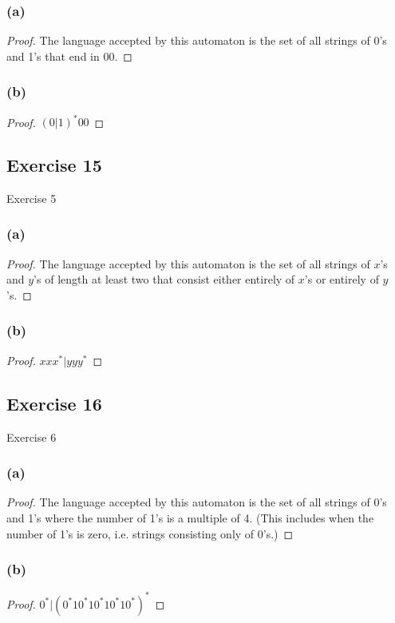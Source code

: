 \documentclass[14pt]{extarticle}
\begin{document}
\subsubsection{(a)}
\begin{proof}
The language accepted by this automaton is the set of all strings of 0’s and 1’s that end in 00.
\end{proof}

\subsubsection{(b)}
\begin{proof}
\((0 | 1)^*00\)
\end{proof}

\subsection{Exercise 15}
Exercise 5
\subsubsection{(a)}
\begin{proof}
The language accepted by this automaton is the set of all strings of \(x\)’s and \(y\)’s of length at least two that 
consist either entirely of \(x\)’s or entirely of \(y\)’s.
\end{proof}

\subsubsection{(b)}
\begin{proof}
\(xxx^* | yyy^*\)
\end{proof}

\subsection{Exercise 16}
Exercise 6
\subsubsection{(a)}
\begin{proof}
The language accepted by this automaton is the set of all strings of 0’s and 1’s where the number of 1's is a multiple 
of 4. (This includes when the number of 1's is zero, i.e. strings consisting only of 0's.)
\end{proof}

\subsubsection{(b)}
\begin{proof}
\(0^* | (0^*10^*10^*10^*10^*)^*\)
\end{proof}
\end{document}
